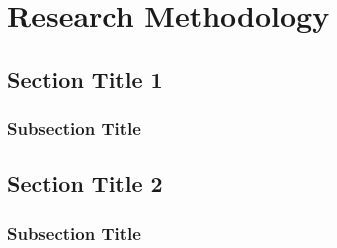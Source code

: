 \chapter{Research Methodology}\label{chap:method}
\section{Section Title 1}\label{sec:1}
\subsection{Subsection Title}
\section{Section Title 2}\label{sec:2}
\subsection{Subsection Title}



